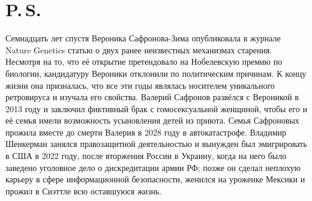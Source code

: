 \chapter*{P.\,S.}

Семнадцать лет спустя Вероника Сафронова-Зима опубликовала в журнале Nature Genetics статью о двух ранее неизвестных механизмах старения.
Несмотря на то, что её открытие претендовало на Нобелевскую премию по биологии, кандидатуру Вероники отклонили по политическим причинам.
К концу жизни она призналась, что все эти годы являлась носителем уникального ретровируса и изучала его свойства.
Валерий Сафронов развёлся с Вероникой в 2013 году и заключил фиктивный брак с гомосексуальной женщиной, чтобы его и её семья имели возможность усыновления детей из приюта.
Семья Сафроновых прожила вместе до смерти Валерия в 2028 году в автокатастрофе.
Владимир Шенкерман занялся правозащитной деятельностью и вынужден был эмигрировать в США в 2022 году, после вторжения России в Украину, когда на него было заведено уголовное дело о дискредитации армии РФ;
позже он сделал неплохую карьеру в сфере информационной безопасности, женился на уроженке Мексики и прожил в Сиэттле всю оставшуюся жизнь.

